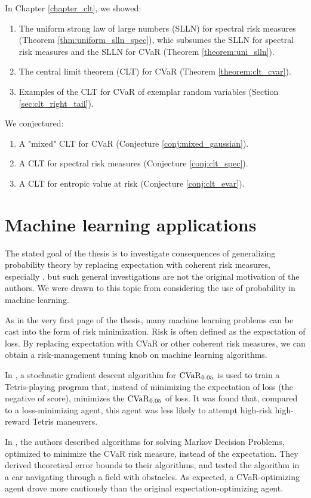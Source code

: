 In Chapter \ref{chapter_clt}, we showed:
\begin{enumerate}
	\item The uniform strong law of large numbers (SLLN) for spectral risk measures (Theorem \ref{thm:uniform_slln_spec}), whic subsumes the SLLN for spectral risk measures and the SLLN for CVaR (Theorem \ref{theorem:uni_slln}).
	\item The central limit theorem (CLT) for CVaR (Theorem \ref{theorem:clt_cvar}).
	\item Examples of the CLT for CVaR of exemplar random variables (Section \ref{sec:clt_right_tail}).
\end{enumerate} 
We conjectured: 
\begin{enumerate}
	\item A "mixed" CLT for CVaR (Conjecture \ref{conj:mixed_gaussian}).
	\item A CLT for spectral risk measures (Conjecture \ref{conj:clt_spec}).
	\item A CLT for entropic value at risk (Conjecture \ref{conj:clt_evar}).
\end{enumerate} 


\section{Machine learning applications}
The stated goal of the thesis is to investigate consequences of generalizing probability theory by replacing expectation with coherent risk measures, especially \cvar, but such general investigations are not the original motivation of the authors. We were drawn to this topic from considering the use of probability in machine learning.

As in the very first page of the thesis, many machine learning problems can be cast into the form of risk minimization. Risk is often defined as the expectation of loss. By replacing expectation with CVaR or other coherent risk measures, we can obtain a risk-management tuning knob on machine learning algorithms.

In \cite{tamarOptimizingCVaRSampling2015}, a stochastic gradient descent algorithm for $\operatorname{CVaR}_{0.05}$ is used to train a Tetris-playing program that, instead of minimizing the expectation of loss (the negative of score), minimizes the $\operatorname{CVaR}_{0.05}$ of loss. It was found that, compared to a loss-minimizing agent, this agent was less likely to attempt high-risk high-reward Tetris maneuvers.

In \cite{chowRisksensitiveRobustDecisionmaking2015}, the authors described algorithms for solving Markov Decision Problems, optimized to minimize the CVaR risk measure, instead of the expectation. They derived theoretical error bounds to their algorithms, and tested the algorithm in a car navigating through a field with obstacles. As expected, a CVaR-optimizing agent drove more cautiously than the original expectation-optimizing agent.


